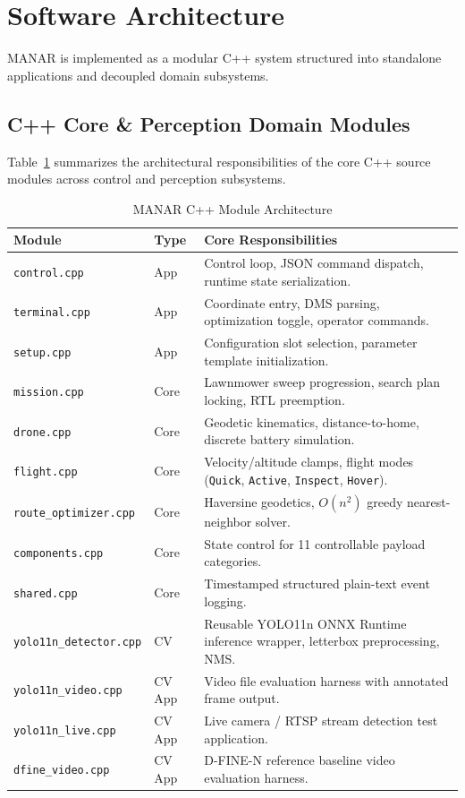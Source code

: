 \section{Software Architecture}

MANAR is implemented as a modular C++ system structured into standalone applications and decoupled domain subsystems.

\subsection{C++ Core \& Perception Domain Modules}
Table~\ref{tab:software_modules} summarizes the architectural responsibilities of the core C++ source modules across control and perception subsystems.

\begin{table}[t]
\caption{MANAR C++ Module Architecture}
\label{tab:software_modules}
\centering
\footnotesize
\begin{tabularx}{\columnwidth}{@{}llX@{}}
\toprule
\textbf{Module} & \textbf{Type} & \textbf{Core Responsibilities} \\
\midrule
\texttt{control.cpp} & App & Control loop, JSON command dispatch, runtime state serialization. \\
\texttt{terminal.cpp} & App & Coordinate entry, DMS parsing, optimization toggle, operator commands. \\
\texttt{setup.cpp} & App & Configuration slot selection, parameter template initialization. \\
\midrule
\texttt{mission.cpp} & Core & Lawnmower sweep progression, search plan locking, RTL preemption. \\
\texttt{drone.cpp} & Core & Geodetic kinematics, distance-to-home, discrete battery simulation. \\
\texttt{flight.cpp} & Core & Velocity/altitude clamps, flight modes (\texttt{Quick}, \texttt{Active}, \texttt{Inspect}, \texttt{Hover}). \\
\texttt{route\_optimizer.cpp} & Core & Haversine geodetics, $O(n^2)$ greedy nearest-neighbor solver. \\
\texttt{components.cpp} & Core & State control for 11 controllable payload categories. \\
\texttt{shared.cpp} & Core & Timestamped structured plain-text event logging. \\
\midrule
\texttt{yolo11n\_detector.cpp} & CV & Reusable YOLO11n ONNX Runtime inference wrapper, letterbox preprocessing, NMS. \\
\texttt{yolo11n\_video.cpp} & CV App & Video file evaluation harness with annotated frame output. \\
\texttt{yolo11n\_live.cpp} & CV App & Live camera / RTSP stream detection test application. \\
\texttt{dfine\_video.cpp} & CV App & D-FINE-N reference baseline video evaluation harness. \\
\bottomrule
\end{tabularx}
\end{table}

